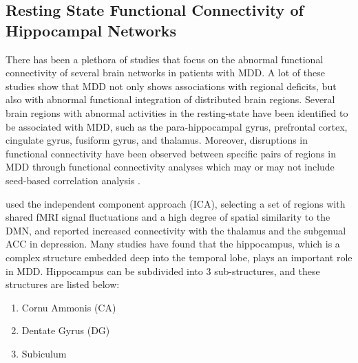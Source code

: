 \documentclass[12pt]{article}
\begin{document}
\subsection{Resting State Functional Connectivity of Hippocampal
Networks}

There has been a plethora of studies that focus on the abnormal
functional connectivity of several brain networks in patients with
MDD. A lot of these studies show that MDD not only shows associations
with regional deficits, but also with abnormal functional integration
of distributed brain regions. Several brain regions with abnormal
activities in the resting-state have been identified to be associated
with MDD, such as the para-hippocampal gyrus, prefrontal cortex,
cingulate gyrus, fusiform gyrus, and thalamus. Moreover, disruptions
in functional connectivity have been observed between specific pairs
of regions in MDD through functional connectivity analyses which may
or may not include seed-based correlation analysis \cite{homogeneity}.

\textcite{frontiers:rsfc} used the independent component approach
(ICA), selecting a set of regions with shared fMRI signal fluctuations
and a high degree of spatial similarity to the DMN, and reported
increased connectivity with the thalamus and the subgenual ACC in
depression. Many studies have found that the hippocampus, which is
a complex structure embedded deep into the temporal lobe, plays an
important role in MDD. Hippocampus can be subdivided into
3 sub-structures, and these structures are listed below:

\begin{enumerate}[nosep]
  \item  Cornu Ammonis (CA)
  \item  Dentate Gyrus (DG)
  \item  Subiculum
\end{enumerate}
\end{document}
